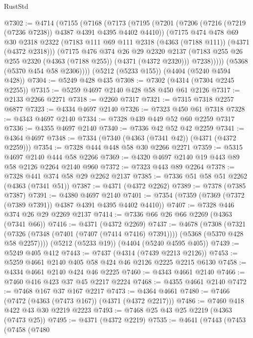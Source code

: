 \begin{lexlean}{RustStd}
\begin{coremodule}
{\begin{coremodule}
{{{{{{{{{{{{{{{{@7302 := @4714
    (@7155
      (@7168
        (@7173
          (@7195
            (@7201
              (@7206 (@7216 (@7219 (@7236 @7238)) @4387 @4391 @4395 @4402 @4410))
              (@7175
                @474
                @478
                @69
                @30
                @2318
                @2322
                (@7183 @111 @69 @111 @2318 (@4363 (@7188 @111)) (@4371 (@4372 @2318)))
                (@7175
                  @476
                  @374
                  @26
                  @29
                  @2320
                  @2137
                  (@7183 @255 @26 @255 @2320 (@4363 (@7188 @255)) (@4371 (@4372 @2320)))
                  @7238)))))
        (@5368 (@5370 @454 @58 @2306))))
    (@5212 (@5233 @155))
    (@4404 (@5240 @4594 @428))
@7304 := @5249 @428 @435
@7308 := @7302 (@4314 (@7304 @2245 @2255))
@7315 := @5259 @4697 @2140 @428 @58 @450 @61 @2126
@7317 := @2133 @2266 @2271
@7318 := @2260 @7317
@7321 := @7315 @7318 @2257 @6877
@7323 := @4334 @4697 @2140
@7326 := @7323 @450 @61 @7318
@7328 := @4343 @4697 @2140
@7334 := @7328 @439 @449 @52 @60 @2259 @7317
@7336 := @4355 @4697 @2140
@7340 := @7336 @42 @52 @42 @2259
@7341 := @4364 @4697
@7348 := @7334 (@7340 (@4363 (@7341 @42)) (@4371 (@4372 @2259)))
@7354 := @7328 @444 @448 @58 @30 @2266 @2271
@7359 := @5315 @4697 @2140 @444 @58 @2266
@7369 := @4320 @4697 @2140 @19 @443 @89 @58 @2126 @2264 @2140 @960
@7372 := @7323 @443 @89 @2264
@7378 := @7328 @441 @374 @58 @29 @2262 @2137
@7385 := @7336 @51 @58 @51 @2262 (@4363 (@7341 @51))
@7387 := @4371 (@4372 @2262)
@7389 := @7378 (@7385 @7387)
@7391 := @4380 @4697 @2140
@7401 := @7354 (@7359 (@7369 (@7372 (@7389 @7391)) @4387 @4391 @4395 @4402 @4410))
@7407 := @7328 @446 @374 @26 @29 @2269 @2137
@7414 := @7336 @66 @26 @66 @2269 (@4363 (@7341 @66))
@7416 := @4371 (@4372 @2269)
@7437 := @4678
    (@7308
      (@7321 (@7326 (@7348 (@7401 (@7407 (@7414 @7416) @7391)))) (@5368 (@5370 @428 @58 @2257))))
    (@5212 (@5233 @19))
    (@4404 (@5240 @4595 @405))
@7439 := @5249 @405 @412
@7443 := @7437 (@4314 (@7439 @2213 @2126))
@7453 := @5259 @4661 @2140 @405 @58 @424 @46 @2126 @2225 @2215 @6130
@7458 := @4334 @4661 @2140 @424 @46 @2225
@7460 := @4343 @4661 @2140
@7466 := @7460 @416 @423 @37 @45 @2217 @2224
@7468 := @4355 @4661 @2140
@7472 := @7468 @167 @37 @167 @2217
@7473 := @4364 @4661
@7480 := @7466 (@7472 (@4363 (@7473 @167)) (@4371 (@4372 @2217)))
@7486 := @7460 @418 @422 @43 @30 @2219 @2223
@7493 := @7468 @25 @43 @25 @2219 (@4363 (@7473 @25))
@7495 := @4371 (@4372 @2219)
@7535 := @4641
    (@7443
      (@7453
        (@7458
          (@7480
}}}}}}}}}}}}}}}}
\end{coremodule}}
\end{coremodule}
\end{lexlean}
